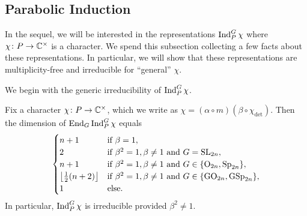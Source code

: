 \subsection{Parabolic Induction}
In the sequel, we will be interested in the representations $\operatorname{Ind}_P^G\chi$ where $\chi\colon P\to\mathbb C^\times$ is a character. We spend this subsection collecting a few facts about these representations. In particular, we will show that these representations are multiplicity-free and irreducible for ``general'' $\chi$.

We begin with the generic irreducibility of $\operatorname{Ind}_P^G \chi$.
\begin{proposition} \label{prop:ind-irred}
    Fix a character $\chi\colon P\to\mathbb C^\times$, which we write as $\chi=(\alpha\circ m)(\beta\circ\chi_{\det})$. Then the dimension of $\operatorname{End}_G\operatorname{Ind}_P^G\chi$ equals
    \[\begin{cases}
        n+1 & \text{if }\beta=1, \\
        2 & \text{if }\beta^2=1,\beta\ne1\text{ and }G=\mathrm{SL}_{2n}, \\
        n+1 & \text{if }\beta^2=1,\beta\ne1\text{ and }G\in\{\mathrm{O}_{2n},\mathrm{Sp}_{2n}\}, \\
        \left\lfloor{\frac12(n+2)}\right\rfloor & \text{if }\beta^2=1,\beta\ne1\text{ and }G\in\{\mathrm{GO}_{2n},\mathrm{GSp}_{2n}\}, \\
        1 & \text{else}.
    \end{cases}\]
    In particular, $\operatorname{Ind}_P^G\chi$ is irreducible provided $\beta^2\ne1$.
\end{proposition}
